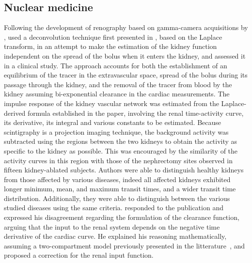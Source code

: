 \subsection{Nuclear medicine}
Following the development of renography based on gamma-camera acquisitions by \citet{Short:1973ip}, \citet{Kenny:1975gl} used a deconvolution technique first presented in \cite{Fleming:1974id}, based on the Laplace transform, in an attempt to make the estimation of the kidney function independent on the spread of the bolus when it enters the kidney, and assessed it in a clinical study.
The approach accounts for both the establishment of an equilibrium of the tracer in the extravascular space, spread of the bolus during its passage through the kidney, and the removal of the tracer from blood by the kidney assuming bi-exponential clearance in the cardiac measurements.
The impulse response of the kidney vascular network was estimated from the Laplace-derived formula established in the paper, involving the renal time-activity curve, its derivative, its integral and various constants to be estimated.
Because scintigraphy is a projection imaging technique, the background activity was subtracted using the regions between the two kidneys to obtain the activity as specific to the kidney as possible.
This was encouraged by the similarity of the activity curves in this region with those of the nephrectomy sites observed in fifteen kidney-ablated subjects.
Authors were able to distinguish healthy kidneys from those affected by various diseases, indeed all affected kidneys exhibited longer minimum, mean, and maximum transit times, and a wider transit time distribution.
Additionally, they were able to distinguish between the various studied diseases using the same criteria.
\citet{Appledorn:1977hl} responded to the publication and expressed his disagreement regarding the formulation of the clearance function, arguing that the input to the renal system depends on the negative time derivative of the cardiac curve.
He explained his reasoning mathematically, assuming a two-compartment model previously presented in the litterature~\cite{DeGrazia:1974uo}, and proposed a correction for the renal input function. 

